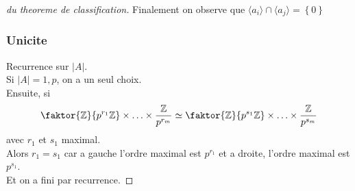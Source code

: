 \documentclass[../main.tex]{subfiles}
\begin{document}
\begin{proof}[du theoreme de classification]
Finalement on observe que $\langle a_i \rangle \cap \langle a_j \rangle = \left\{ 0 \right\} $ 
\subsubsection*{Unicite}
Recurrence sur $|A|$.\\
Si $|A| = 1, p$, on a un seul choix.\\
Ensuite, si
\[ 
	\faktor{ \mathbb{Z}}{p^{r_1}\mathbb{Z}}\times \ldots \times \frac{\mathbb{Z}}{p^{r_m}} \simeq \faktor{ \mathbb{Z}}{p^{s_1}\mathbb{Z}}\times \ldots \times \frac{\mathbb{Z}}{p^{s_m}}
\]
avec $r_1$ et $s_1$ maximal.\\
Alors $r_1= s_1$ car a gauche l'ordre maximal est $p^{r_1}$ et a droite, l'ordre maximal est $p^{s_1}$.\\
Et on a fini par recurrence.

\end{proof}
	
	
\end{document}
